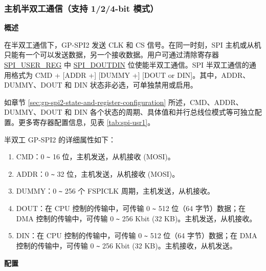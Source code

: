 \documentclass[main\_\_CN.tex]{subfiles}
\begin{document}
\subsubsection{主机半双工通信（支持 1/2/4-bit 模式）}
\label{sec:gp-spi2-1/2/8-bits}

\textbf{概述}

在半双工通信下，GP-SPI2 发送 CLK 和 CS 信号。在同一时刻，SPI 主机或从机只能有一个可以发送数据，另一个接收数据。用户可通过清除寄存器 \hyperref[regdesc:SPIUSERREG]{SPI\_USER\_REG} 中 \hyperref[fielddesc:SPIDOUTDIN]{SPI\_DOUTDIN} 位使能半双工通信。SPI 半双工通信的通用格式为 CMD + [ADDR +] [DUMMY +] [DOUT or DIN]。其中，ADDR、DUMMY、DOUT 和 DIN 状态非必选，可单独禁用或启用。

如章节  \ref{sec:gp-spi2-state-and-register-configuration} 所述，CMD、ADDR、DUMMY、DOUT 和 DIN 各个状态的周期、具体值和并行总线位模式等可独立配置。更多寄存器配置信息，见表  \ref{tab:spi-usr1}。

半双工 GP-SPI2 的详细属性如下：

\begin{enumerate}
    \item CMD：0 \verb+~+ 16 位，主机发送，从机接收 (MOSI)。
    \item ADDR：0 \verb+~+ 32 位，主机发送，从机接收 (MOSI)。
    \item DUMMY：0 \verb+~+ 256 个 FSPICLK 周期，主机发送，从机接收。
    \item DOUT：在 CPU 控制的传输中，可传输 0 \verb+~+ 512 位（64 字节）数据；在 DMA 控制的传输中，可传输 0 \verb+~+ 256 Kbit (32 KB)。主机发送，从机接收。
   
    \item DIN：在 CPU 控制的传输中，可传输 0 \verb+~+ 512 位（64 字节）数据；在 DMA 控制的传输中，可传输 0 \verb+~+ 256 Kbit (32 KB)。主机接收，从机发送。
\end{enumerate}

\textbf{配置}
\end{document}
